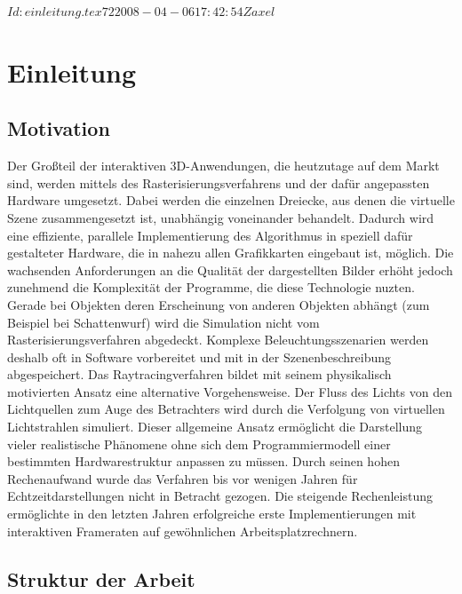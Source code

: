 \svnInfo $Id: einleitung.tex 72 2008-04-06 17:42:54Z axel $
\chapter{Einleitung}

\section{Motivation}
Der Großteil der interaktiven 3D-Anwendungen, die heutzutage auf dem Markt sind, werden mittels des Rasterisierungsverfahrens und der dafür angepassten Hardware umgesetzt. Dabei werden die einzelnen Dreiecke, aus denen die virtuelle Szene zusammengesetzt ist, unabhängig voneinander behandelt. Dadurch wird eine effiziente, parallele Implementierung des Algorithmus in speziell dafür gestalteter Hardware, die in nahezu allen Grafikkarten eingebaut ist, möglich.
Die wachsenden Anforderungen an die Qualität der dargestellten Bilder erhöht jedoch zunehmend die Komplexität der Programme, die diese Technologie nuzten. Gerade bei Objekten deren Erscheinung von anderen Objekten abhängt (zum Beispiel bei Schattenwurf) wird die Simulation nicht vom Rasterisierungsverfahren abgedeckt.
Komplexe Beleuchtungsszenarien werden deshalb oft in Software vorbereitet und mit in der Szenenbeschreibung abgespeichert.
Das Raytracingverfahren bildet mit seinem physikalisch motivierten Ansatz eine alternative Vorgehensweise. Der Fluss des Lichts von den Lichtquellen zum Auge des Betrachters wird durch die Verfolgung von virtuellen Lichtstrahlen simuliert. Dieser allgemeine Ansatz ermöglicht die Darstellung vieler realistische Phänomene ohne sich dem Programmiermodell einer bestimmten Hardwarestruktur anpassen zu müssen.
Durch seinen hohen Rechenaufwand wurde das Verfahren bis vor wenigen Jahren für Echtzeitdarstellungen nicht in Betracht gezogen. Die steigende Rechenleistung ermöglichte in den letzten Jahren erfolgreiche erste Implementierungen mit interaktiven Frameraten auf gewöhnlichen Arbeitsplatzrechnern.


\section{Struktur der Arbeit}

